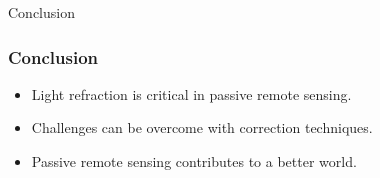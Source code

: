 \documentclass{beamer}
\begin{document}
\begin{frame}{Conclusion}
  \frametitle{Conclusion}
  \begin{itemize}
    \item Light refraction is critical in passive remote sensing.
    \item Challenges can be overcome with correction techniques.
    \item Passive remote sensing contributes to a better world.
  \end{itemize}
  \vfill
  \centering
\end{frame}
\end{document}
